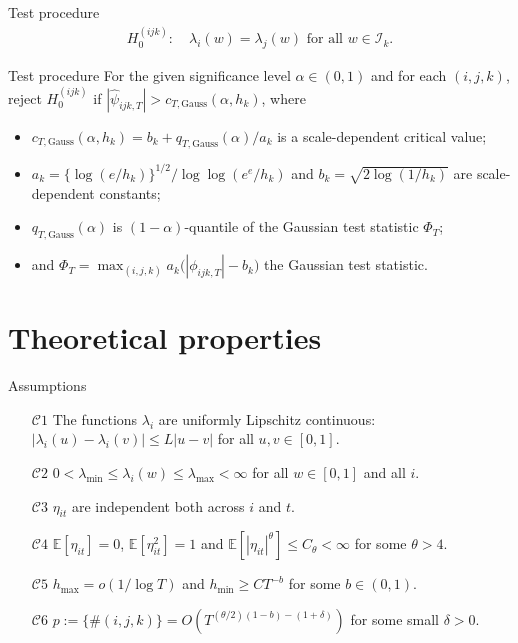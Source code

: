 \documentclass[10pt]{beamer}
\newcommand{\E}{\mathbb{E}}
\begin{document}
\begin{frame}[label = frame_test]{Test procedure}
\begin{align*}
H_0^{(ijk)}: \quad \lambda_i(w) = \lambda_j(w) \text{ for all } w \in \mathcal{I}_k.
\end{align*} \pause
\vspace{-5mm}
\begin{block}{Test procedure}
For the given significance level $\alpha \in (0,1)$ and for each $(i,j,k)$, reject $H_0^{(ijk)}$ if $|\widehat{\psi}_{ijk,T}| > c_{T,\text{Gauss}}(\alpha,h_k)$\pause, where 
\begin{itemize}
	\item $c_{T,\text{Gauss}}(\alpha,h_k) = b_k + q_{T,\text{Gauss}}(\alpha)/a_k$ is a scale-dependent critical value;\pause
	\item $a_k = \{\log(e/h_k)\}^{1/2} / \log \log(e^e / h_k)$ and $b_k = \sqrt{2 \log(1/h_k)}$ are scale-dependent constants; \hyperlink{frame_constants}{} \pause
	\item $q_{T, \text{Gauss}} (\alpha)$ is $(1-\alpha)$-quantile of the Gaussian test statistic $\Phi_T$;\pause
	\item and $ \Phi_T = \max_{(i,j,k)} a_k \big( |\phi_{ijk,T}| - b_k \big) $ the Gaussian test statistic.
\end{itemize}
\end{block}
\end{frame}

\section{Theoretical properties}
\begin{frame}{Assumptions}
\begin{itemize}
\item[$\mathcal{C}1$] \label{C1} The functions $\lambda_i$ are uniformly Lipschitz continuous: $|\lambda_i(u) - \lambda_i(v)| \le L |u-v|$ for all $u, v \in [0,1]$.
\item[$\mathcal{C}2$] \label{C2} $0 < \lambda_{\min} \le \lambda_i(w) \le \lambda_{\max} < \infty$ for all $w \in [0, 1]$ and all $i$. 
\item[$\mathcal{C}3$] \label{C3} $\eta_{it}$ are independent both across $i$ and $t$.
\item[$\mathcal{C}4$] \label{C4} $\E[\eta_{it}] = 0$, $\E[\eta_{it}^2] = 1$ and $\E[|\eta_{it}|^\theta] \le C_\theta < \infty$ for some $\theta > 4$. 
\item[$\mathcal{C}5$] \label{C5} $h_{\max} = o(1/\log T)$ and $h_{\min} \ge CT^{-b}$ for some $b \in (0,1)$.
\item[$\mathcal{C}6$] \label{C6} $p := \{ \# (i, j, k) \} = O(T^{(\theta/2)(1-b)-(1+\delta)})$ for some small $\delta > 0$.
\end{itemize}
\end{frame}
\end{document}

